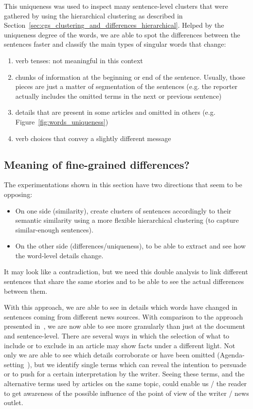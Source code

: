 This uniqueness was used to inspect many sentence-level clusters that were gathered by using the hierarchical clustering as described in Section~\ref{sec:cgs_clustering_and_differences_hierarchical}. Helped by the uniqueness degree of the words, we are able to spot the differences between the sentences faster and classify the main types of singular words that change:
\begin{enumerate}
    \item verb tenses: not meaningful in this context
    \item chunks of information at the beginning or end of the sentence. Usually, those pieces are just a matter of segmentation of the sentences (e.g. the reporter actually includes the omitted terms in the next or previous sentence) 
    \item details that are present in some articles and omitted in others (e.g. Figure~\ref{fig:words_uniqueness})
    \item verb choices that convey a slightly different message
\end{enumerate}

\subsection{\statusgreen Meaning of fine-grained differences?}
The experimentations shown in this section have two directions that seem to be opposing: 
\begin{itemize}
    \item On one side (similarity), create clusters of sentences accordingly to their semantic similarity using a more flexible hierarchical clustering (to capture similar-enough sentences). %
    \item On the other side (differences/uniqueness), to be able to extract and see how the word-level details change.
\end{itemize}

It may look like a contradiction, but we need this double analysis to link different sentences that share the same stories and to be able to see the actual differences between them.

With this approach, we are able to see in details which words have changed in sentences coming from different news sources.
With comparison to the approach presented in~\citet{bountouridis2018explaining}, we are now able to see more granularly than just at the document and sentence-level.
There are several ways in which the selection of what to include or to exclude in an article may show facts under a different light. Not only we are able to see which details corroborate or have been omitted (Agenda-setting~\citep{TODO}), but we identify single terms which can reveal the intention to persuade or to push for a certain interpretation by the writer. Seeing these terms, and the alternative terms used by articles on the same topic, could enable us / the reader to get awareness of the possible influence of the point of view of the writer / news outlet.

